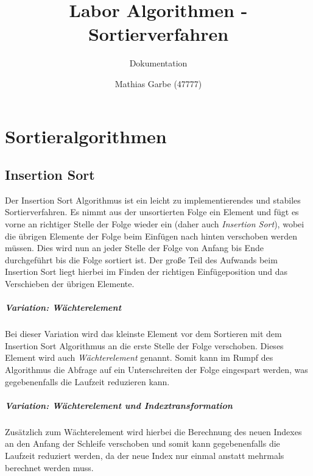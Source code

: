 \documentclass[12pt, a4paper, titlepage, hidelinks]{scrreprt}
\title{Labor Algorithmen - Sortierverfahren}
\subtitle{Dokumentation}
\author{Mathias Garbe (47777)}
\begin{document}
\maketitle

\tableofcontents
{}

\clearpage


\chapter{Sortieralgorithmen}

\section{Insertion Sort}

Der Insertion Sort Algorithmus ist ein leicht zu implementierendes und stabiles Sortierverfahren. Es nimmt aus der unsortierten Folge ein Element und fügt es vorne an richtiger Stelle der Folge wieder ein (daher auch \textit{Insertion Sort}), wobei die übrigen Elemente der Folge beim Einfügen nach hinten verschoben werden müssen. Dies wird nun an jeder Stelle der Folge von Anfang bis Ende durchgeführt bis die Folge sortiert ist. Der große Teil des Aufwands beim Insertion Sort liegt hierbei im Finden der richtigen Einfügeposition und das Verschieben der übrigen Elemente.

\paragraph{Variation: Wächterelement} Bei dieser Variation wird das kleinste Element vor dem Sortieren mit dem Insertion Sort Algorithmus an die erste Stelle der Folge verschoben. Dieses Element wird auch \textit{Wächterelement} genannt. Somit kann im Rumpf des Algorithmus die Abfrage auf ein Unterschreiten der Folge eingespart werden, was gegebenenfalls die Laufzeit reduzieren kann.

\paragraph{Variation: Wächterelement und Indextransformation} Zusätzlich zum Wächterelement wird hierbei die Berechnung des neuen Indexes an den Anfang der Schleife verschoben und somit kann gegebenenfalls die Laufzeit reduziert werden, da der neue Index nur einmal anstatt mehrmals berechnet werden muss.
\end{document}
